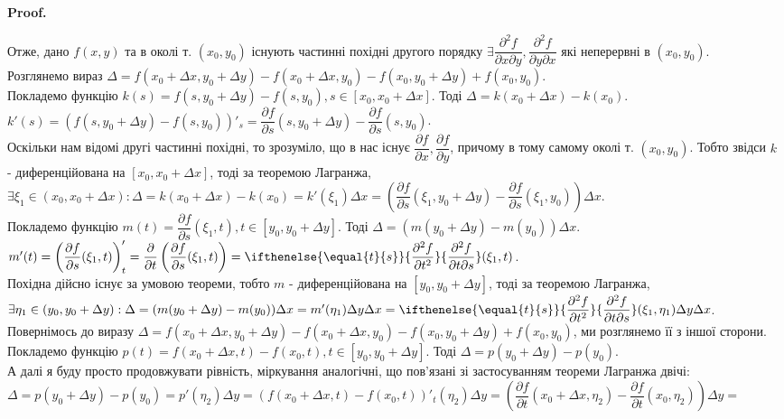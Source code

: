 \documentclass[a4paper, 10pt]{article}
\makeatletter
\def\departial#1#2{\dfrac{\partial {#1}}{\partial {#2}}}
\def\seconddepartial#1#2#3{\ifthenelse{\equal{#2}{#3}}{\dfrac{\partial^2 {#1}}{\partial {#2}^2}}{\dfrac{\partial^2 {#1}}{\partial {#2} \partial {#3}}}}
\def\qed{$\blacksquare$}
\theoremstyle{theoremdd}
\theoremstyle{theoremdd}
\theoremstyle{theoremdd}
\theoremstyle{theoremdd}
\theoremstyle{theoremdd}
\theoremstyle{theoremdd}
\theoremstyle{theoremdd}
\theoremstyle{theoremdd}
\theoremstyle{theoremdd}
\renewenvironment{proof}[1][Proof.\\]{\par
\pushQED{\hfill \qed}%
\normalfont \topsep6\p@\@plus6\p@\relax
\trivlist
\item\relax
{\bfseries
#1\@addpunct{.}}\hspace\labelsep\ignorespaces
}{%
\popQED\endtrivlist\@endpefalse
}
\makeatother
\begin{document}
\begin{proof}
Отже, дано $f(x,y)$ та в околі т. $(x_0,y_0)$ існують частинні похідні другого порядку $\exists \dfrac{\partial^2 f}{\partial x \partial y}, \dfrac{\partial^2 f}{\partial y \partial x}$ які неперервні в $(x_0,y_0)$.\\
Розглянемо вираз $\Delta = f(x_0+\Delta x, y_0+\Delta y) - f(x_0+\Delta x,y_0) - f(x_0,y_0+\Delta y) + f(x_0,y_0)$.\\
Покладемо функцію $k(s) = f(s,y_0+\Delta y) - f(s,y_0), s \in [x_0,x_0+\Delta x]$. Тоді $\Delta = k(x_0+\Delta x) - k(x_0)$.\\
$k'(s) = (f(s,y_0+\Delta y) - f(s,y_0))'_s = \departial{f}{s}(s,y_0+\Delta y) - \departial{f}{s}(s,y_0)$.\\
Оскільки нам відомі другі частинні похідні, то зрозуміло, що в нас існує $\departial{f}{x}, \departial{f}{y}$, причому в тому самому околі т. $(x_0,y_0)$. Тобто звідси $k$ - диференційована на $[x_0, x_0+\Delta x]$, тоді за теоремою Лагранжа, $\exists \xi_1 \in (x_0,x_0+\Delta x): \Delta = k(x_0+\Delta x) - k(x_0) = k'(\xi_1) \Delta x = \left( \departial{f}{s}(\xi_1,y_0+\Delta y) - \departial{f}{s}(\xi_1,y_0) \right) \Delta x$.\\
Покладемо функцію $m(t) = \departial{f}{s}(\xi_1,t), t \in [y_0,y_0+\Delta y]$. Тоді $\Delta = (m(y_0+\Delta y) - m(y_0)) \Delta x$.\\
$m'(t) = \left( \departial{f}{s}(\xi_1,t) \right)'_t = \departial{}{t}\left( \departial{f}{s}(\xi_1,t) \right) = \seconddepartial{f}{t}{s}(\xi_1,t)$.\\
Похідна дійсно існує за умовою теореми, тобто $m$ - диференційована на $[y_0,y_0+\Delta y]$, тоді за теоремою Лагранжа, $\exists \eta_1 \in (y_0,y_0+\Delta y): \Delta = (m(y_0+\Delta y)-m(y_0)) \Delta x = m'(\eta_1) \Delta y \Delta x = \seconddepartial{f}{t}{s}(\xi_1,\eta_1) \Delta y \Delta x$.
\bigskip \\
Повернімось до виразу $\Delta = f(x_0+\Delta x, y_0+\Delta y) - f(x_0+\Delta x,y_0) - f(x_0,y_0+\Delta y) + f(x_0,y_0)$, ми розглянемо її з іншої сторони.\\
Покладемо функцію $p(t) = f(x_0+\Delta x,t) - f(x_0,t), t \in [y_0,y_0+\Delta y]$. Тоді $\Delta = p(y_0+\Delta y) - p(y_0)$.\\
А далі я буду просто продовжувати рівність, міркування аналогічні, що пов'язані зі застосуванням теореми Лагранжа двічі:\\
$\Delta = p(y_0+\Delta y) - p(y_0) = p'(\eta_2) \Delta y = (f(x_0+\Delta x, t) - f(x_0,t))'_t (\eta_2) \Delta y = \left( \departial{f}{t}(x_0+\Delta x, \eta_2) - \departial{f}{t}(x_0,\eta_2) \right) \Delta y \boxed{=}$\\

\end{proof}
\end{document}
